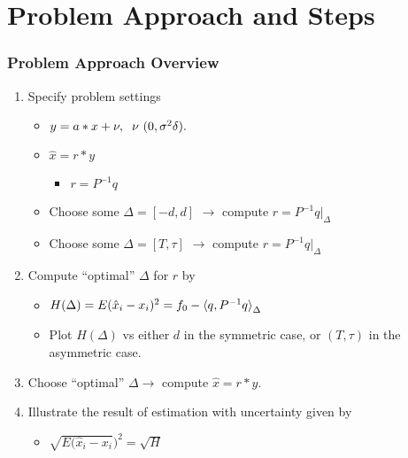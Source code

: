 \documentclass[t]{beamer}
\begin{document}
\section{Problem Approach and Steps} 
\begin{frame}
\frametitle{Problem Approach Overview}
\begin{enumerate}
\item Specify problem settings
\begin{itemize}
\item $y = a*x+\nu, \hspace{.2cm} \nu ~(0,\sigma^2\delta). $
\item $ \hat{x} = r*y$ 
\begin{itemize}
\item $ r = P^{-1}q$ 
\end{itemize}
\item Choose some $\Delta = [-d,d]$  $\rightarrow $ compute $ r = P^{-1}q|_\Delta$ 
\item Choose some $\Delta = [T,\tau]$  $\rightarrow $ compute $ r = P^{-1}q|_\Delta$ 
\end{itemize}
\item Compute ``optimal'' $\Delta$ for $r$ by
\begin{itemize}
\item $H(\Delta) = E(\hat{x}_{i} - x_{i})^2 = f_{0} - \braket{q,P^{-1}q}_\Delta$
\item Plot $H(\Delta)$ vs either $d$ in the symmetric case,  or $(T,\tau)$ in the asymmetric case.
\end{itemize}
\item Choose ``optimal'' $\Delta \rightarrow$ compute $\widehat x = r * y$.
\item Illustrate the result of estimation with uncertainty given by
\begin{itemize}
\item $\sqrt{E(\hat{x}_{i} - x_{i}})^2 = \sqrt{H}$
\end{itemize}
\end{enumerate}
\end{frame}
\end{document}
